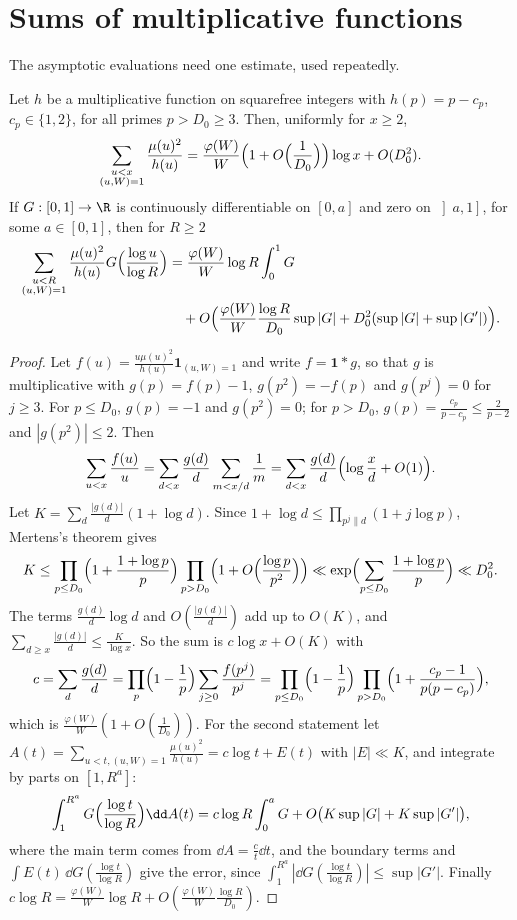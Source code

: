 \section{Sums of multiplicative functions}

The asymptotic evaluations need one estimate, used repeatedly.

\begin{lemma}\label{lem:musum}
Let $h$ be a multiplicative function on squarefree integers with $h(p)=p-c_p$, $c_p\in\{1,2\}$, for all primes $p>D_0\ge3$. Then, uniformly for $x\ge2$,
\[
\sum_{\substack{u<x\\(u,W)=1}}\frac{\mu(u)^2}{h(u)}=\frac{\varphi(W)}W\Bigl(1+O\Bigl(\frac1{D_0}\Bigr)\Bigr)\log x+O(D_0^2).
\]
If $G:[0,1]\to\R$ is continuously differentiable on $[0,a]$ and zero on $\left]a,1\right]$, for some $a\in[0,1]$, then for $R\ge2$
\[
\begin{aligned}\sum_{\substack{u<R\\(u,W)=1}}\frac{\mu(u)^2}{h(u)}G\Bigl(\frac{\log u}{\log R}\Bigr)&=\frac{\varphi(W)}W\log R\int_0^1G\\&\quad+O\Bigl(\frac{\varphi(W)}W\frac{\log R}{D_0}\sup|G|+D_0^2(\sup|G|+\sup|G'|)\Bigr).\end{aligned}
\]
\end{lemma}
\begin{proof}
Let $f(u)=\frac{u\mu(u)^2}{h(u)}\mathbf 1_{(u,W)=1}$ and write $f=\mathbf 1*g$, so that $g$ is multiplicative with $g(p)=f(p)-1$, $g(p^2)=-f(p)$ and $g(p^j)=0$ for $j\ge3$. For $p\le D_0$, $g(p)=-1$ and $g(p^2)=0$; for $p>D_0$, $g(p)=\frac{c_p}{p-c_p}\le\frac2{p-2}$ and $|g(p^2)|\le2$. Then
\[
\sum_{u<x}\frac{f(u)}u=\sum_{d<x}\frac{g(d)}d\sum_{m<x/d}\frac1m=\sum_{d<x}\frac{g(d)}d\Bigl(\log\frac xd+O(1)\Bigr).
\]
Let $K=\sum_d\frac{|g(d)|}d(1+\log d)$. Since $1+\log d\le\prod_{p^j\|d}(1+j\log p)$, Mertens's theorem gives
\[
K\le\prod_{p\le D_0}\Bigl(1+\frac{1+\log p}p\Bigr)\prod_{p>D_0}\Bigl(1+O\Bigl(\frac{\log p}{p^2}\Bigr)\Bigr)\ll\exp\Bigl(\sum_{p\le D_0}\frac{1+\log p}p\Bigr)\ll D_0^2.
\] The terms $\frac{g(d)}d\log d$ and $O(\frac{|g(d)|}d)$ add up to $O(K)$, and $\sum_{d\ge x}\frac{|g(d)|}d\le\frac K{\log x}$. So the sum is $c\log x+O(K)$ with
\[
c=\sum_d\frac{g(d)}d=\prod_p\Bigl(1-\frac1p\Bigr)\sum_{j\ge0}\frac{f(p^j)}{p^j}=\prod_{p\le D_0}\Bigl(1-\frac1p\Bigr)\prod_{p>D_0}\Bigl(1+\frac{c_p-1}{p(p-c_p)}\Bigr),
\]
which is $\frac{\varphi(W)}W(1+O(\frac1{D_0}))$. For the second statement let $A(t)=\sum_{u<t,(u,W)=1}\frac{\mu(u)^2}{h(u)}=c\log t+E(t)$ with $|E|\ll K$, and integrate by parts on $[1,R^a]$:
\[
\int_{1}^{R^a}G\Bigl(\frac{\log t}{\log R}\Bigr)\dd A(t)=c\log R\int_0^aG+O\bigl(K\sup|G|+K\sup|G'|\bigr),
\]
where the main term comes from $\dd A=\frac c t\dd t$, and the boundary terms and $\int E(t)\,\dd G(\frac{\log t}{\log R})$ give the error, since $\int_1^{R^a}|\dd G(\frac{\log t}{\log R})|\le\sup|G'|$. Finally $c\log R=\frac{\varphi(W)}W\log R+O(\frac{\varphi(W)}W\frac{\log R}{D_0})$.
\end{proof}

